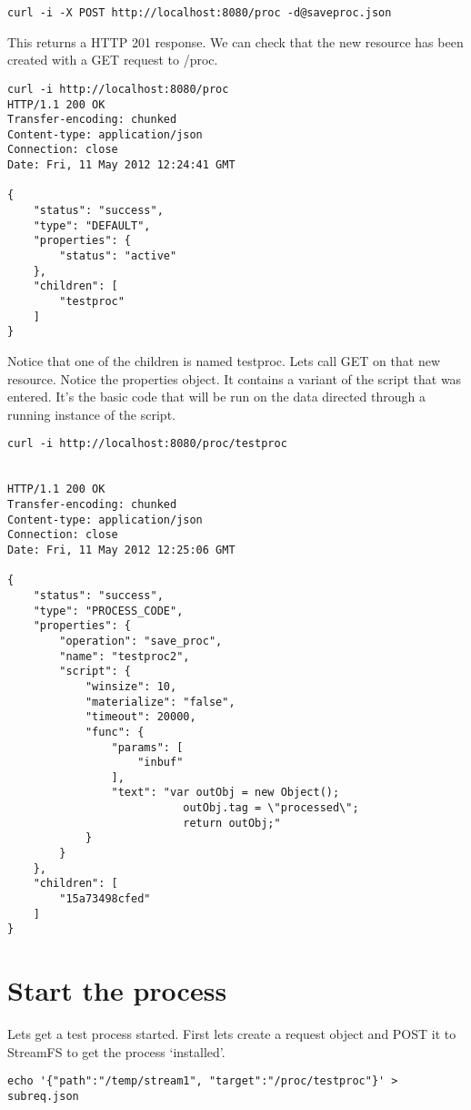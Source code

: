 \begin{lstlisting}
curl -i -X POST http://localhost:8080/proc -d@saveproc.json
\end{lstlisting}

This returns a HTTP 201 response. We can check that the new resource has been created with a GET request to /proc.

\begin{lstlisting}
curl -i http://localhost:8080/proc
HTTP/1.1 200 OK
Transfer-encoding: chunked
Content-type: application/json
Connection: close
Date: Fri, 11 May 2012 12:24:41 GMT

{
    "status": "success",
    "type": "DEFAULT",
    "properties": {
        "status": "active"
    },
    "children": [
        "testproc"
    ]
}
\end{lstlisting}

Notice that one of the children is named testproc. Lets call GET on that new resource. Notice the properties object. It contains a variant of the script that was entered. It's the basic code that will be run on the data directed through a running instance of the script.

\begin{lstlisting}
curl -i http://localhost:8080/proc/testproc


HTTP/1.1 200 OK
Transfer-encoding: chunked
Content-type: application/json
Connection: close
Date: Fri, 11 May 2012 12:25:06 GMT

{
    "status": "success",
    "type": "PROCESS_CODE",
    "properties": {
        "operation": "save_proc",
        "name": "testproc2",
        "script": {
            "winsize": 10,
            "materialize": "false",
            "timeout": 20000,
            "func": {
                "params": [
                    "inbuf"
                ],
                "text": "var outObj = new Object();  
                           outObj.tag = \"processed\"; 
                           return outObj;"
            }
        }
    },
    "children": [
        "15a73498cfed"
    ]
}
\end{lstlisting}


\section{Start the process}

Lets get a test process started. First lets create a request object and POST it to StreamFS to get the process `installed'.

\begin{lstlisting}
echo '{"path":"/temp/stream1", "target":"/proc/testproc"}' > subreq.json
\end{lstlisting}

